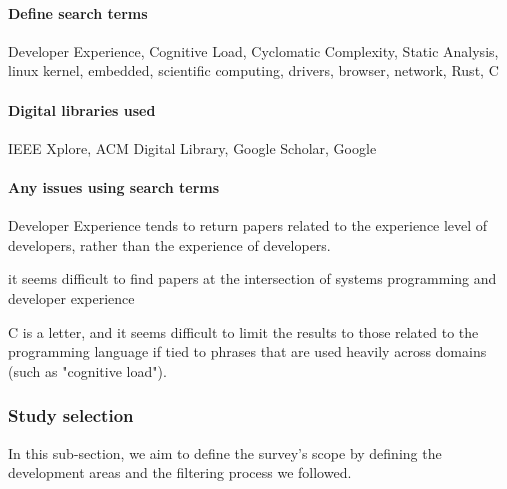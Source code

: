 \documentclass[conference]{IEEEtran}
\begin{document}
\paragraph{\color{Black}Define search terms}{Developer Experience, Cognitive Load, Cyclomatic Complexity, Static Analysis,  linux kernel, embedded, scientific computing, drivers, browser, network, Rust, C}
\paragraph{\color{Black}Digital libraries used} {IEEE Xplore, ACM Digital Library, Google Scholar, Google}
\paragraph{\color{Black}Any issues using search terms}{ \begin{itemize}
        {\item Developer Experience tends to return papers related to the experience level of developers, rather than the experience of developers.}
              {\item it seems difficult to find papers at the intersection of systems programming and developer experience}
              {\item C is a letter, and it seems difficult to limit the results to those related to the programming language if tied to phrases that are used heavily across domains (such as "cognitive load").}
    \end{itemize}
}

\subsubsection{Study selection}
In this sub-section, we aim to define the survey's scope by defining the development areas and the filtering process we followed.
\end{document}
